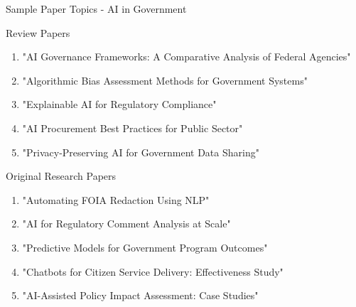 \documentclass[11pt]{beamer}
\begin{document}
	\begin{frame}{Sample Paper Topics - AI in Government}
		\scriptsize
		\begin{block}{Review Papers}
			\begin{enumerate}
				\item "AI Governance Frameworks: A Comparative Analysis of Federal Agencies"
				\item "Algorithmic Bias Assessment Methods for Government Systems"
				\item "Explainable AI for Regulatory Compliance"
				\item "AI Procurement Best Practices for Public Sector"
				\item "Privacy-Preserving AI for Government Data Sharing"
			\end{enumerate}
		\end{block}
		\begin{block}{Original Research Papers}
			\begin{enumerate}
				\item "Automating FOIA Redaction Using NLP"
				\item "AI for Regulatory Comment Analysis at Scale"
				\item "Predictive Models for Government Program Outcomes"
				\item "Chatbots for Citizen Service Delivery: Effectiveness Study"
				\item "AI-Assisted Policy Impact Assessment: Case Studies"
			\end{enumerate}
		\end{block}
	\end{frame}
	
\end{document}

